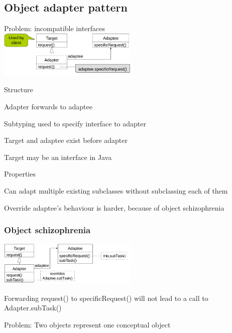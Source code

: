 \subsection{Object adapter pattern}
\enumstart
	\item Problem: incompatible interfaces
	\\ \includegraphics[width=0.5\textwidth]{img/object_adapter_pattern.png}
	\item Structure
	\enumstart
		\item Adapter forwards to adaptee
		\item Subtyping used to specify interface to adapter
		\item Target and adaptee exist before adapter
		\item Target may be an interface in Java
	\enumend
	\item Properties
	\enumstart
		\item Can adapt multiple existing subclasses without subclassing each of them
		 \item Override adaptee's behaviour is harder, because of object schizophrenia
	\enumend
\enumend

\subsubsection{Object schizophrenia}
\includegraphics[width=0.5\textwidth]{img/object_schizophrenia.png}
\enumstart
	\item Forwarding request() to specificRequest() will not lead to a call to Adapter.subTask()
	\item Problem: Two objects represent one conceptual object
\enumend

